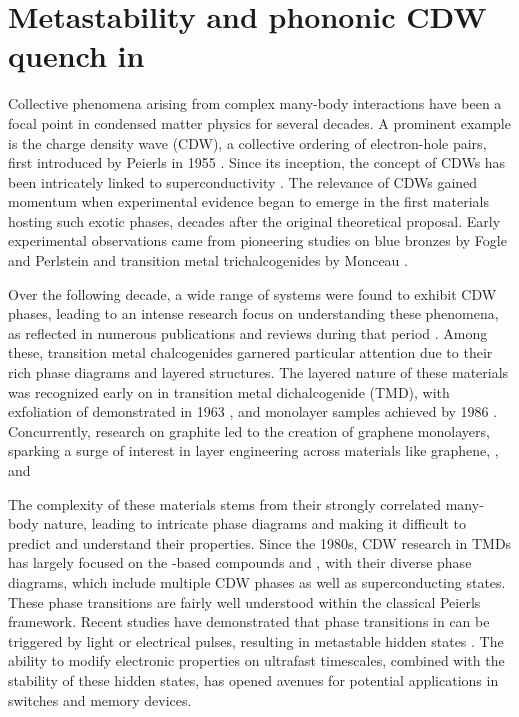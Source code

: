 \chapter{Metastability and phononic CDW quench in }
\label{ch:tate2}

Collective phenomena arising from complex many-body interactions have been a focal point in condensed matter physics for several decades.
A prominent example is the charge density wave (CDW), a collective ordering of electron-hole pairs, first introduced by Peierls in 1955 \cite{peierls_quantum_1996}.
Since its inception, the concept of CDWs has been intricately linked to superconductivity \cite{frohlich_theory_1997}.
The relevance of CDWs gained momentum when experimental evidence began to emerge in the first materials hosting such exotic phases, decades after the original theoretical proposal.
Early experimental observations came from pioneering studies on blue bronzes by Fogle and Perlstein \cite{fogle_semiconductor--metal_1972} and transition metal trichalcogenides by Monceau \cite{monceau_electric_1976}.

Over the following decade, a wide range of systems were found to exhibit CDW phases, leading to an intense research focus on understanding these phenomena, as reflected in numerous publications and reviews during that period \cite{wilson_questions_1978,gruner_dynamics_1988,yoffe_electronic_1990,wilson_charge-density_2001}.
Among these, transition metal chalcogenides garnered particular attention due to their rich phase diagrams and layered structures.
The layered nature of these materials was recognized early on in transition metal dichalcogenide (TMD), with exfoliation of  demonstrated in 1963 \cite{frindt_physical_1997}, and monolayer samples achieved by 1986 \cite{joensen_single-layer_1986}.
Concurrently, research on graphite led to the creation of graphene monolayers, sparking a surge of interest in layer engineering across materials like graphene, , and  \cite{iijima_helical_1991,tenne_polyhedral_1992,feldman_high-rate_1995}

The complexity of these materials stems from their strongly correlated many-body nature, leading to intricate phase diagrams and making it difficult to predict and understand their properties.
Since the 1980s, CDW research in TMDs has largely focused on the -based compounds  and , with their diverse phase diagrams, which include multiple CDW phases as well as superconducting states.
These phase transitions are fairly well understood within the classical Peierls framework.
Recent studies have demonstrated that phase transitions in  can be triggered by light or electrical pulses, resulting in metastable hidden states \cite{vaskivskyi_controlling_2015,maklar_coherent_2023}.
The ability to modify electronic properties on ultrafast timescales, combined with the stability of these hidden states, has opened avenues for potential applications in switches and memory devices.

